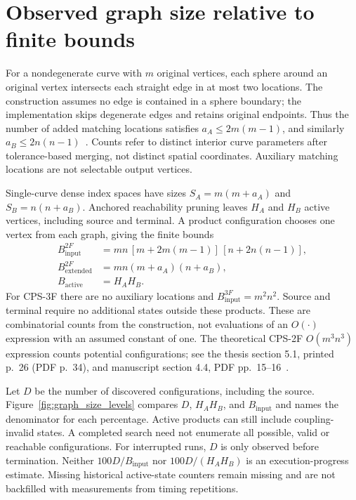 \section{Observed graph size relative to finite bounds}
For a nondegenerate curve with $m$ original vertices, each sphere around an original vertex intersects each straight edge in at most two locations. The construction assumes no edge is contained in a sphere boundary; the implementation skips degenerate edges and retains original endpoints. Thus the number of added matching locations satisfies $a_A\leq 2m(m-1)$, and similarly $a_B\leq 2n(n-1)$~\cite[Observation 4, printed p.~18 (PDF p.~26)]{thesis}. Counts refer to distinct interior curve parameters after tolerance-based merging, not distinct spatial coordinates. Auxiliary matching locations are not selectable output vertices.

Single-curve dense index spaces have sizes $S_A=m(m+a_A)$ and $S_B=n(n+a_B)$. Anchored reachability pruning leaves $H_A$ and $H_B$ active vertices, including source and terminal. A product configuration chooses one vertex from each graph, giving the finite bounds
\begin{align}
B_{\mathrm{input}}^{2F}&=mn\,[m+2m(m-1)]\,[n+2n(n-1)],\\
B_{\mathrm{extended}}^{2F}&=mn(m+a_A)(n+a_B),\\
B_{\mathrm{active}}&=H_AH_B.
\end{align}
For CPS-3F there are no auxiliary locations and $B_{\mathrm{input}}^{3F}=m^2n^2$. Source and terminal require no additional states outside these products. These are combinatorial counts from the construction, not evaluations of an $O(\cdot)$ expression with an assumed constant of one. The theoretical CPS-2F $O(m^3n^3)$ expression counts potential configurations; see the thesis section 5.1, printed p.~26 (PDF p.~34), and manuscript section 4.4, PDF pp.~15--16~\cite{thesis,manuscript}.

Let $D$ be the number of discovered configurations, including the source. Figure~\ref{fig:graph_size_levels} compares $D$, $H_AH_B$, and $B_{\mathrm{input}}$ and names the denominator for each percentage. Active products can still include coupling-invalid states. A completed search need not enumerate all possible, valid or reachable configurations. For interrupted runs, $D$ is only observed before termination. Neither $100D/B_{\mathrm{input}}$ nor $100D/(H_AH_B)$ is an execution-progress estimate. Missing historical active-state counters remain missing and are not backfilled with measurements from timing repetitions.


